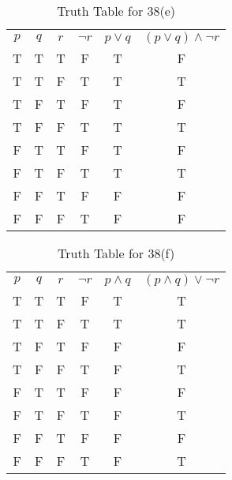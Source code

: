 \documentclass{Axon}
\begin{document}
\begin{table}[ht]
    \centering
    \begin{tabular}{c|c|c|c|c|c}
        \(p\) & \(q\) & \(r\) & \(\lnot r\) & \(p \lor q\) & \((p \lor q) \land \lnot r\) \\
        T     & T     & T     & F           & T            & F                            \\
        T     & T     & F     & T           & T            & T                            \\
        T     & F     & T     & F           & T            & F                            \\
        T     & F     & F     & T           & T            & T                            \\
        F     & T     & T     & F           & T            & F                            \\
        F     & T     & F     & T           & T            & T                            \\
        F     & F     & T     & F           & F            & F                            \\
        F     & F     & F     & T           & F            & F
    \end{tabular}
    \caption{Truth Table for 38(e)}
\end{table}

\begin{table}[ht]
    \centering
    \begin{tabular}{c|c|c|c|c|c}
        \(p\) & \(q\) & \(r\) & \(\lnot r\) & \(p \land q\) & \((p \land q) \lor \lnot r\) \\
        T     & T     & T     & F           & T             & T                            \\
        T     & T     & F     & T           & T             & T                            \\
        T     & F     & T     & F           & F             & F                            \\
        T     & F     & F     & T           & F             & T                            \\
        F     & T     & T     & F           & F             & F                            \\
        F     & T     & F     & T           & F             & T                            \\
        F     & F     & T     & F           & F             & F                            \\
        F     & F     & F     & T           & F             & T                            
    \end{tabular}
    \caption{Truth Table for 38(f)}
\end{table}
\end{document}
